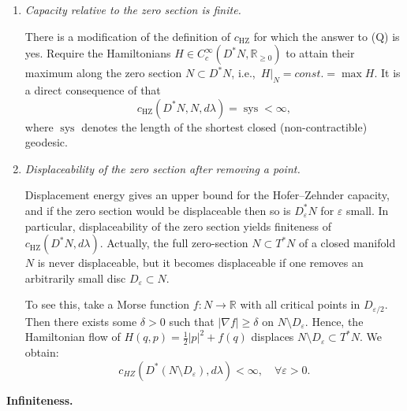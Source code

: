 \documentclass[11pt]{article}
\theoremstyle{definition}
\begin{document}
\begin{enumerate}
\item \emph{Capacity relative to the zero section is finite.}

There is a modification of the definition of $c_{\mathrm{HZ}}$ for which the answer to (Q) is yes. Require the Hamiltonians $H\in C_c^\infty(D^{*}N,\mathbb{R}_{\ge 0})$ to attain their maximum along the zero section $N\subset D^{*}N$, i.e.,\ $H|_{N}=const.=\max H$. It is a direct consequence of \cite{Wbr06} that
$$
c_{\mathrm{HZ}}(D^{*}N,N,d\lambda)=\operatorname{sys}<\infty,
$$
where $\operatorname{sys}$ denotes the length of the shortest closed (non-contractible) geodesic.

\item \emph{Displaceability of the zero section after removing a point.}

Displacement energy gives an upper bound for the Hofer--Zehnder capacity, and if the zero section would be displaceable then so is $D^{*}_{\varepsilon}N$ for $\varepsilon$ small. In particular, displaceability of the zero section yields finiteness of $c_{\mathrm{HZ}}(D^{*}N,d\lambda)$. Actually, the full zero-section $N\subset T^{*}N$ of a closed manifold $N$ is never displaceable, but it becomes displaceable if one removes an arbitrarily small disc $D_{\varepsilon}\subset N$. 

To see this, take a Morse function $f:N\to\mathbb{R}$ with all critical points in $D_{\varepsilon/2}$. Then there exists some $\delta>0$ such that $\vert \nabla f\vert \geq \delta$ on $N\setminus D_{\varepsilon}$. Hence, the Hamiltonian flow of $H(q,p)=\frac{1}{2}\vert p\vert^2+f(q)$ displaces $N\setminus D_{\varepsilon}\subset T^{*}N$. We obtain:
$$
c_{HZ}(D^*(N\setminus D_\varepsilon), d\lambda)<\infty,\quad \forall\varepsilon>0.
$$
\end{enumerate}

\medskip
\noindent\textbf{Infiniteness.}
\end{document}
